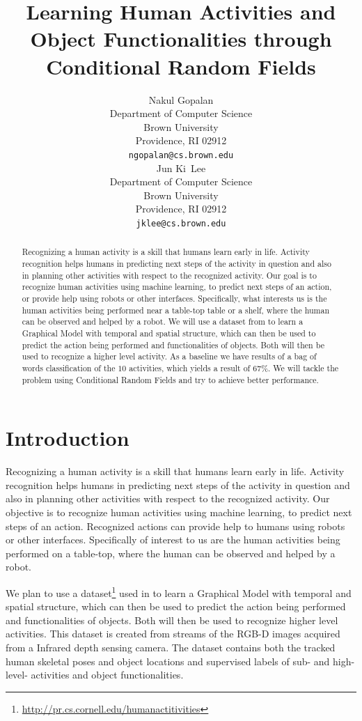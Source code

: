 \documentclass{article} %
\title{Learning Human Activities and Object Functionalities through Conditional Random Fields}
\author{
Nakul Gopalan\\
Department of Computer Science\\
Brown University\\
Providence, RI 02912 \\
\texttt{ngopalan@cs.brown.edu} \\
\And
Jun Ki~Lee\\
Department of Computer Science\\
Brown University\\
Providence, RI 02912 \\
\texttt{jklee@cs.brown.edu} \\
}
\begin{document}
\maketitle

\begin{abstract}
Recognizing a human activity is a skill that humans learn early in life. Activity recognition helps humans in predicting next steps of the activity in question and also in planning other activities with respect to the recognized activity. Our goal is to recognize human activities using machine learning, to predict next steps of an action, or provide help using robots or other interfaces. Specifically, what interests us is the human activities being performed near a table-top table or a shelf, where the human can be observed and helped by a robot. We will use a dataset from \cite{koppula2013detectingactivitiesrgbd} to learn a Graphical Model with temporal and spatial structure, which can then be used to predict the action being performed and functionalities of objects. Both will then be used to recognize a higher level activity. As a baseline we have results of a bag of words classification of the $10$ activities, which yields a result of $67\%$. We will tackle the problem using Conditional Random Fields and try to achieve better performance.
\end{abstract}

\section{Introduction}
Recognizing a human activity is a skill that humans learn early in life. Activity recognition helps humans in predicting next steps of the activity in question and also in planning other activities with respect to the recognized activity. Our objective is to recognize human activities using machine learning, to predict next steps of an action. Recognized actions can provide help to humans using robots or other interfaces. Specifically of interest to us are the human activities being performed on a table-top, where the human can be observed and helped by a robot.

We plan to use a dataset\footnote{\url{http://pr.cs.cornell.edu/humanactitivities}} used in \cite{koppula2013detectingactivitiesrgbd}
 to learn a Graphical Model with temporal and spatial structure, which can then be used to predict the action being performed and functionalities of objects. Both will then be used to recognize higher level activities. This dataset is created from streams of the RGB-D images acquired from a Infrared depth sensing camera. The dataset contains both the tracked human skeletal poses and object locations and supervised labels of sub- and high-level- activities and object functionalities. 
 
\end{document}
